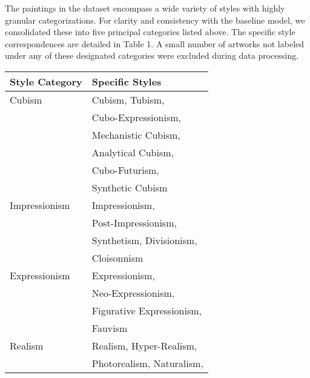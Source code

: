 The paintings in the dataset encompass a wide variety of styles with highly
granular categorizations. For clarity and consistency with the baseline model,
we consolidated these into five principal categories listed above. The specific
style correspondences are detailed in Table 1. A small number of artworks not
labeled under any of these designated categories were excluded during data
processing.
\begin{table}[ht]
    \centering
    \small
    \begin{tabular}{@{}p{} p{}@{}}
        \toprule
        \textbf{Style Category} & \textbf{Specific Styles}         \\
        \midrule
        Cubism                  & Cubism, Tubism,                  \\
                                & Cubo-Expressionism,              \\
                                & Mechanistic Cubism,              \\
                                & Analytical Cubism,               \\
                                & Cubo-Futurism,                   \\
                                & Synthetic Cubism                 \\
        \midrule
        Impressionism           & Impressionism,                   \\
                                & Post-Impressionism,              \\
                                & Synthetism, Divisionism,         \\
                                & Cloisonnism                      \\
        \midrule
        Expressionism           & Expressionism,                   \\
                                & Neo-Expressionism,               \\
                                & Figurative Expressionism,        \\
                                & Fauvism                          \\
        \midrule
        Realism                 & Realism, Hyper-Realism,          \\
                                & Photorealism, Naturalism,        \\

\end{tabular}
\end{table}
